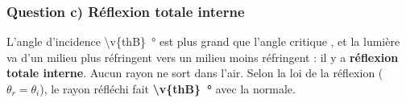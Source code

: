 \subsubsection*{Question c) Réflexion totale interne}
L'angle d'incidence \qty{\v{thB}}{\degree} est plus grand que l'angle critique , et la lumière va d'un milieu plus réfringent vers un milieu moins réfringent : il y a \textbf{réflexion totale interne}. Aucun rayon ne sort dans l'air. Selon la loi de la réflexion ($\theta_r = \theta_i$), le rayon réfléchi fait \textbf{\qty{\v{thB}}{\degree}} avec la normale.
